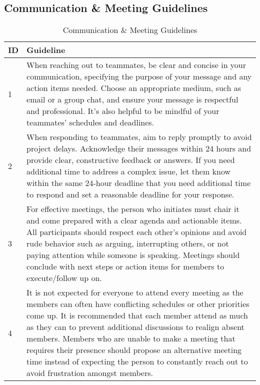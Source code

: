 \documentclass[12pt, titlepage]{article}
\begin{document}
\subsection*{Communication \& Meeting Guidelines}
\begin{table}[H]
\caption{Communication \& Meeting Guidelines}
\centering
\begin{tabular}{|l|p{12cm}|}
\hline
\textbf{ID} & \textbf{Guideline} \\ \hline
1 & When reaching out to teammates, be clear and concise in your communication, specifying the purpose of your message and any action items needed. Choose an appropriate medium, such as email or a group chat, and ensure your message is respectful and professional. It's also helpful to be mindful of your teammates' schedules and deadlines. \\ \hline
2 & When responding to teammates, aim to reply promptly to avoid project delays. Acknowledge their messages within 24 hours and provide clear, constructive feedback or answers. If you need additional time to address a complex issue, let them know within the same 24-hour deadline that you need additional time to respond and set a reasonable deadline for your response. \\ \hline
3 & For effective meetings, the person who initiates must chair it and come prepared with a clear agenda and actionable items. All participants should respect each other’s opinions and avoid rude behavior such as arguing, interrupting others, or not paying attention while someone is speaking. Meetings should conclude with next steps or action items for members to execute/follow up on. \\ \hline
4 & It is not expected for everyone to attend every meeting as the members can often have conflicting schedules or other priorities come up. It is recommended that each member attend as much as they can to prevent additional discussions to realign absent members. Members who are unable to make a meeting that requires their presence should propose an alternative meeting time instead of expecting the person to constantly reach out to avoid frustration amongst members. \\ \hline
\end{tabular}
\label{tab:communication-guidelines}
\end{table}
\end{document}
